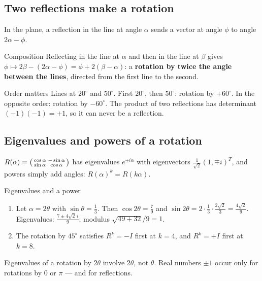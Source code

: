 \documentclass[11pt,a4paper,openany]{book}
\newcounter{wex}[section]
\newenvironment{steps}{\begin{enumerate}[label=\textbf{Step \arabic*.}, leftmargin=4.2em, itemsep=2pt]}{\end{enumerate}}
\begin{document}
\subsection{Two reflections make a rotation}
In the plane, a reflection in the line at angle $\alpha$ sends a vector at angle $\phi$ to angle $2\alpha - \phi$.
\begin{keyres}{Composition}
Reflecting in the line at $\alpha$ and then in the line at $\beta$ gives $\phi \mapsto 2\beta - (2\alpha - \phi) = \phi + 2(\beta - \alpha)$: a \textbf{rotation by twice the angle between the lines}, directed from the first line to the second.
\end{keyres}
\begin{wexample}{Order matters}
Lines at $20^\circ$ and $50^\circ$. First $20^\circ$, then $50^\circ$: rotation by $+60^\circ$. In the opposite order: rotation by $-60^\circ$. The product of two reflections has determinant $(-1)(-1) = +1$, so it can never be a reflection.
\end{wexample}

\subsection{Eigenvalues and powers of a rotation}
$R(\alpha) = \begin{psmallmatrix}\cos\alpha & -\sin\alpha\\ \sin\alpha & \cos\alpha\end{psmallmatrix}$ has eigenvalues $e^{\pm i\alpha}$ with eigenvectors $\frac{1}{\sqrt2}(1, \mp i)^{T}$, and powers simply add angles: $R(\alpha)^k = R(k\alpha)$.
\begin{wexample}{Eigenvalues and a power}
\begin{steps}
\item Let $\alpha = 2\theta$ with $\sin\theta = \frac13$. Then $\cos2\theta = \frac79$ and $\sin2\theta = 2\cdot\frac13\cdot\frac{2\sqrt2}{3} = \frac{4\sqrt2}{9}$. Eigenvalues: $\frac{7 \pm 4\sqrt2\,i}{9}$; modulus $\sqrt{49 + 32}/9 = 1$. \checkmark
\item The rotation by $45^\circ$ satisfies $R^k = -I$ first at $k = 4$, and $R^k = +I$ first at $k = 8$.
\end{steps}
\end{wexample}

\begin{trap}
Eigenvalues of a rotation by $2\theta$ involve $2\theta$, not $\theta$. Real numbers $\pm1$ occur only for rotations by $0$ or $\pi$ --- and for reflections.
\end{trap}
\end{document}
